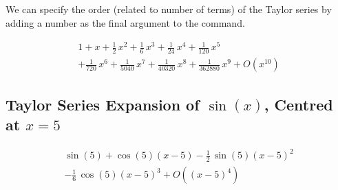 We can specify the order (related to number of terms) of the Taylor series by adding a number as the final argument to the command.

\begin{maplegroup}
\begin{mapleinput}
\end{mapleinput}
\mapleresult
\begin{maplelatex}
{\[\begin{array}{l}\displaystyle 1+x+\frac{1}{2}\,{x}^{2}+\frac{1}{6}\,{x}^{3}+\frac{1}{24}\,{x}^{4}+\frac{1}{120}\,{x}^{5}\\
\displaystyle +{\frac {1}{720}}\,{x}^{6}+{\frac {1}{5040}}\,{x}^{7}+{\frac {1}{40320}}\,{x}^{8}+{\frac {1}{362880}}\,{x}^{9}+O \left( {x}^{10} \right) \end{array}\]}
\end{maplelatex}
\end{maplegroup}

\subsection{Taylor Series Expansion of $\sin(x)$, Centred at $x=5$}


\begin{maplegroup}
\begin{mapleinput}
\end{mapleinput}
\mapleresult
\begin{maplelatex}
{\[\begin{array}{l}\displaystyle \sin \left( 5 \right) +\cos \left( 5 \right)  \left( x-5 \right) -\frac{1}{2}\,\sin \left( 5 \right)  \left( x-5 \right) ^{2}\\
\displaystyle -\frac{1}{6}\,\cos \left( 5 \right)  \left( x-5 \right) ^{3}+O \left(  \left( x-5 \right) ^{4} \right) \end{array} \]}
\end{maplelatex}
\end{maplegroup}


